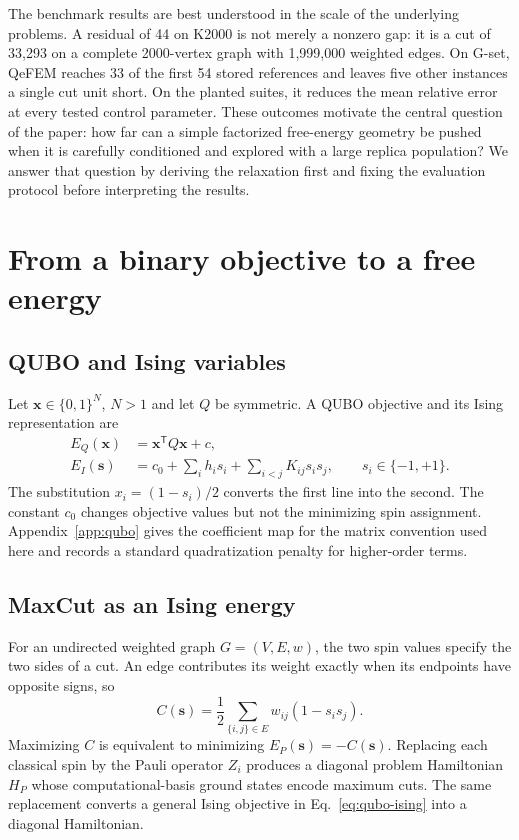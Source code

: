 \documentclass[
  aps,
  prx,
  reprint,
  amsmath,
  amssymb,
  groupedaddress,
  nofootinbib,
  floatfix,
  longbibliography
]{revtex4-2}
\newcommand{\qefem}{QeFEM}
\begin{document}
The benchmark results are best understood in the scale of the underlying
problems.  A residual of 44 on K2000 is not merely a nonzero gap: it is a cut
of 33,293 on a complete 2000-vertex graph with 1,999,000 weighted edges.  On
G-set, \qefem{} reaches 33 of the first 54 stored references and leaves five
other instances a single cut unit short.  On the planted suites, it reduces
the mean relative error at every tested control parameter.  These outcomes
motivate the central question of the paper: how far can a simple factorized
free-energy geometry be pushed when it is carefully conditioned and explored
with a large replica population?  We answer that question by deriving the
relaxation first and fixing the evaluation protocol before interpreting the
results.

\section{From a binary objective to a free energy}
\label{sec:formulation}

\subsection{QUBO and Ising variables}

Let $\bm x\in\{0,1\}^{N}$, $N>1$ and let $Q$ be symmetric.  A QUBO objective and its
Ising representation are
\begin{equation}
 \begin{aligned}
  E_Q(\bm x)&=\bm x^{\mathsf T}Q\bm x+c,\\
  E_I(\bm s)&=c_0+\sum_i h_i s_i+\sum_{i<j}K_{ij}s_i s_j,
  \qquad s_i\in\{-1,+1\}.
 \end{aligned}
 \label{eq:qubo-ising}
\end{equation}
The substitution $x_i=(1-s_i)/2$ converts the first line into the second.
The constant $c_0$ changes objective values but not the minimizing spin
assignment.  Appendix~\ref{app:qubo} gives the coefficient map for the matrix
convention used here and records a standard quadratization penalty for
higher-order terms.

\subsection{MaxCut as an Ising energy}

For an undirected weighted graph $G=(V,E,w)$, the two spin values specify the
two sides of a cut.  An edge contributes its weight exactly when its endpoints
have opposite signs, so
\begin{equation}
 C(\bm s)=\frac12\sum_{\{i,j\}\in E}w_{ij}(1-s_i s_j).
 \label{eq:maxcut}
\end{equation}
Maximizing $C$ is equivalent to minimizing $E_P(\bm s)=-C(\bm s)$.  Replacing
each classical spin by the Pauli operator $Z_i$ produces a diagonal problem
Hamiltonian $H_P$ whose computational-basis ground states encode maximum cuts.
The same replacement converts a general Ising objective in
Eq.~\eqref{eq:qubo-ising} into a diagonal Hamiltonian.
\end{document}
